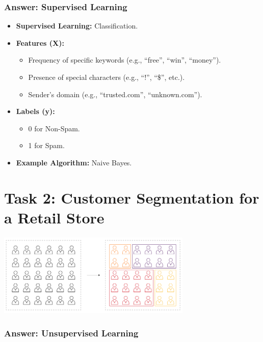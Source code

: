 \documentclass[
  letterpaper,
  DIV=11,
  numbers=noendperiod]{scrreprt}
\providecommand{\tightlist}{%
  \setlength{\itemsep}{0pt}\setlength{\parskip}{0pt}}\usepackage{longtable,booktabs,array}
\begin{document}
\subsubsection{Answer: Supervised
Learning}\label{answer-supervised-learning}

\begin{itemize}
\tightlist
\item
  \textbf{Supervised Learning:} Classification.
\item
  \textbf{Features (X):}

  \begin{itemize}
  \tightlist
  \item
    Frequency of specific keywords (e.g., ``free'', ``win'', ``money'').
  \item
    Presence of special characters (e.g., ``!'', ``\$'', etc.).
  \item
    Sender's domain (e.g., ``trusted.com'', ``unknown.com'').
  \end{itemize}
\item
  \textbf{Labels (y):}

  \begin{itemize}
  \tightlist
  \item
    0 for Non-Spam.
  \item
    1 for Spam.
  \end{itemize}
\item
  \textbf{Example Algorithm:} Naive Bayes.
\end{itemize}

\section{Task 2: Customer Segmentation for a Retail
Store}\label{task-2-customer-segmentation-for-a-retail-store}

\includegraphics[width=3.64583in,height=1.5625in]{lecture12/images/UnsupervisedLearning.png}

\subsubsection{Answer: Unsupervised
Learning}\label{answer-unsupervised-learning}
\end{document}
